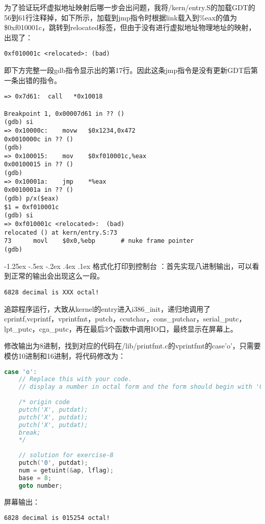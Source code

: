 \documentclass[a4paper, 11pt]{ctexart}
\makeatletter
\newcommand{\xiaosihao}{\fontsize{12pt}{\baselineskip}\selectfont}
\renewcommand\subsection{\@startsection{subsection}{1}{\z@}%
{-1.25ex \@plus -.5ex \@minus -.2ex}%
{.4ex \@plus .1ex}%
{\normalfont\xiaosihao\CJKfamily{hei}}}
\makeatother
\begin{document}
为了验证玩坏虚拟地址映射后哪一步会出问题，我将/kern/entry.S的加载GDT的56到61行注释掉，如下所示，加载到jmp指令时根据link载入到\%eax的值为\$0xf010001c，跳转到relocated标签，但由于没有进行虚拟地址物理地址的映射，出现了：
\begin{lstlisting}[language={[x86masm]Assembler},numbers=none]
0xf010001c <relocated>:	(bad)
\end{lstlisting}

即下方完整一段gdb指令显示出的第17行。因此这条jmp指令是没有更新GDT后第一条出错的指令。

\begin{lstlisting}[language={[x86masm]Assembler}]
=> 0x7d61:	call   *0x10018

Breakpoint 1, 0x00007d61 in ?? ()
(gdb) si
=> 0x10000c:	movw   $0x1234,0x472
0x0010000c in ?? ()
(gdb) 
=> 0x100015:	mov    $0xf010001c,%eax
0x00100015 in ?? ()
(gdb) 
=> 0x10001a:	jmp    *%eax
0x0010001a in ?? ()
(gdb) p/x($eax)
$1 = 0xf010001c
(gdb) si
=> 0xf010001c <relocated>:	(bad)  
relocated () at kern/entry.S:73
73		movl	$0x0,%ebp		# nuke frame pointer
(gdb)
\end{lstlisting}

\subsection{格式化打印到控制台}
\color{red}{练习8}：\color{black}首先实现八进制输出，可以看到正常的输出会出现这么一段。
\begin{lstlisting}[numbers=none]
6828 decimal is XXX octal!
\end{lstlisting}

追踪程序运行，大致从kernel的entry进入i386\_init，递归地调用了cprintf,vcprintf，vprintfmt，putch，ccutchar，cons\_putchar，serial\_putc，lpt\_putc，cga\_putc，再在最后3个函数中调用IO口，最终显示在屏幕上。

修改输出为8进制，找到对应的代码在/lib/printfmt.c的vprintfmt的case'o'，只需要模仿10进制和16进制，将代码修改为：
\begin{lstlisting}[language={C}]
case 'o':
	// Replace this with your code.
	// display a number in octal form and the form should begin with '0'
	
	/* origin code
	putch('X', putdat);
	putch('X', putdat);
	putch('X', putdat);
	break;
	*/
	
	// solution for exercise-8
	putch('0', putdat);
	num = getuint(&ap, lflag);
	base = 8;
	goto number;
\end{lstlisting}

屏幕输出：
\begin{lstlisting}[numbers=none]
6828 decimal is 015254 octal!
\end{lstlisting}
\end{document}
